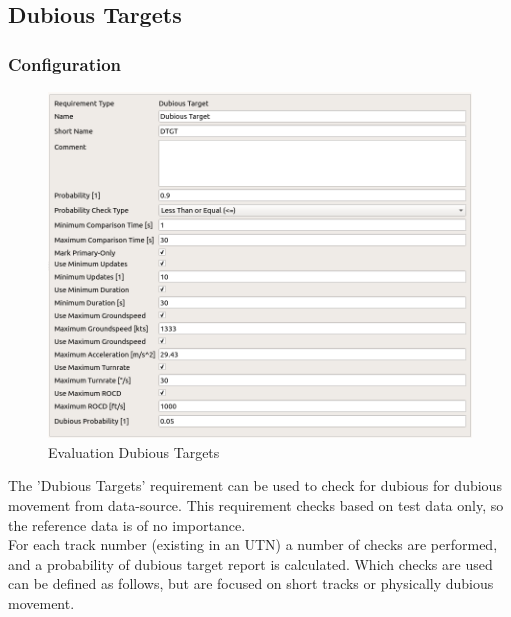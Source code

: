
\subsection{Dubious Targets}
\label{sec:eval_req_dubious_targets} 

\subsubsection{Configuration}

\begin{figure}[H]
    \includegraphics[width=14cm,frame]{figures/eval_req_dubious_targets.png}
   \caption{Evaluation Dubious Targets}
\end{figure}

The 'Dubious Targets' requirement can be used to check for dubious for dubious movement from data-source. This requirement checks based on test data only, so the reference data is of no importance. \\

For each track number (existing in an UTN) a number of checks are performed, and a probability of dubious target report is calculated. Which checks are used can be defined as follows, but are focused on short tracks or physically dubious movement. \\

